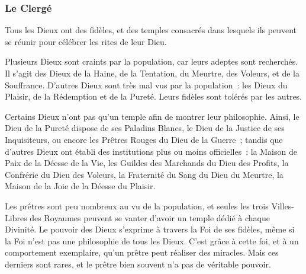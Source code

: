 \documentclass[a4paper,10pt,openany]{book}
\begin{document}
\begin{multicols}{2}
\subsubsection{Le Clergé}
Tous les Dieux ont des fidèles, et des temples consacrés dans lesquels ils peuvent se réunir pour célébrer les rites de leur Dieu.\par Plusieurs Dieux
sont craints par la population, car leurs adeptes sont recherchés. Il s’agit des Dieux de la Haine, de la Tentation, du Meurtre, des Voleurs, et de la
Souffrance. D’autres Dieux sont très mal vus par la population : les Dieux du Plaisir, de la Rédemption et de la Pureté. Leurs fidèles sont tolérés
par les autres.\par Certains Dieux n’ont pas qu’un temple afin de montrer leur philosophie. Ainsi, le Dieu de la Pureté dispose de ses Paladins
Blancs, le Dieu de la Justice de ses Inquisiteurs, ou encore les Prêtres Rouges du Dieu de la Guerre ; tandis que d’autres Dieux ont établi des
institutions plus ou moins officielles : la Maison de Paix de la Déesse de la Vie, les Guildes des Marchands du Dieu des Profits, la Confrérie du Dieu
des Voleurs, la Fraternité du Sang du Dieu du Meurtre, la Maison de la Joie de la Déesse du Plaisir.\par Les prêtres sont peu nombreux au vu de la
population, et seules les trois Villes-Libres des Royaumes peuvent se vanter d’avoir un temple dédié à chaque Divinité. Le pouvoir des Dieux s’exprime
à travers la Foi de ses fidèles, même si la Foi n’est pas une philosophie de tous les Dieux. C’est grâce à cette foi, et à un comportement exemplaire,
qu’un prêtre peut réaliser des miracles. Mais ces derniers sont rares, et le prêtre bien souvent n’a pas de véritable pouvoir.

\end{multicols}
\end{document}
